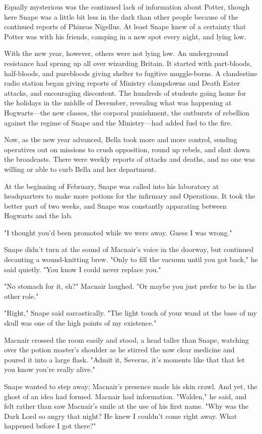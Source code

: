 Equally mysterious was the continued lack of information about Potter, though here Snape was a little bit less in the dark than other people because of the continued reports of Phineas Nigellus. At least Snape knew of a certainty that Potter was with his friends, camping in a new spot every night, and lying low.

With the new year, however, others were not lying low. An underground resistance had sprung up all over wizarding Britain. It started with part-bloods, half-bloods, and purebloods giving shelter to fugitive muggle-borns. A clandestine radio station began giving reports of Ministry clampdowns and Death Eater attacks, and encouraging discontent. The hundreds of students going home for the holidays in the middle of December, revealing what was happening at Hogwarts—the new classes, the corporal punishment, the outbursts of rebellion against the regime of Snape and the Ministry—had added fuel to the fire.

Now, as the new year advanced, Bella took more and more control, sending operatives out on missions to crush opposition, round up rebels, and shut down the broadcasts. There were weekly reports of attacks and deaths, and no one was willing or able to curb Bella and her department.

At the beginning of February, Snape was called into his laboratory at headquarters to make more potions for the infirmary and Operations. It took the better part of two weeks, and Snape was constantly apparating between Hogwarts and the lab.

"I thought you'd been promoted while we were away. Guess I was wrong."

Snape didn't turn at the sound of Macnair's voice in the doorway, but continued decanting a wound-knitting brew. "Only to fill the vacuum until you got back," he said quietly. "You know I could never replace you."

"No stomach for it, eh?" Macnair laughed. "Or maybe you just prefer to be in the other role."

"Right," Snape said sarcastically. "The light touch of your wand at the base of my skull was one of the high points of my existence."

Macnair crossed the room easily and stood, a head taller than Snape, watching over the potion master's shoulder as he stirred the now clear medicine and poured it into a large flask. "Admit it, Severus, it's moments like that that let you know you're really alive."

Snape wanted to step away; Macnair's presence made his skin crawl. And yet, the ghost of an idea had formed. Macnair had information. "Walden," he said, and felt rather than saw Macnair's smile at the use of his first name. "Why was the Dark Lord so angry that night? He knew I couldn't come right away. What happened before I got there?"

